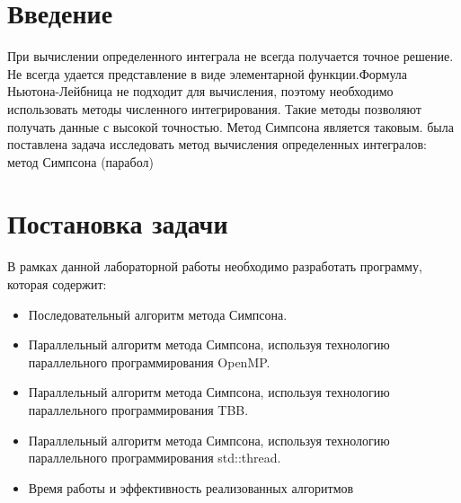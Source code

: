 \documentclass{report}
\begin{document}
\setcounter{page}{2}

\tableofcontents
\newpage

\section*{Введение}
При вычислении определенного интеграла не всегда получается точное решение. Не всегда удается представление в виде элементарной функции.Формула Ньютона-Лейбница не подходит для вычисления, поэтому необходимо использовать методы численного интегрирования.  Такие методы позволяют получать данные с высокой точностью.  Метод Симпсона является таковым.
 была поставлена задача исследовать метод вычисления определенных интегралов: метод Симпсона (парабол)
\newpage

\section*{Постановка задачи}
В рамках данной лабораторной работы необходимо разработать программу, которая содержит:  
\begin{itemize}
    \item Последовательный алгоритм метода Симпсона.
   \item Параллельный алгоритм метода Симпсона, используя технологию параллельного программирования OpenMP.
    \item Параллельный алгоритм метода Симпсона, используя технологию параллельного программирования TBB.
    \item Параллельный алгоритм метода Симпсона, используя технологию параллельного программирования std::thread.
    \item Время работы и эффективность  реализованных алгоритмов
\end{itemize}
\newpage

\end{document}
